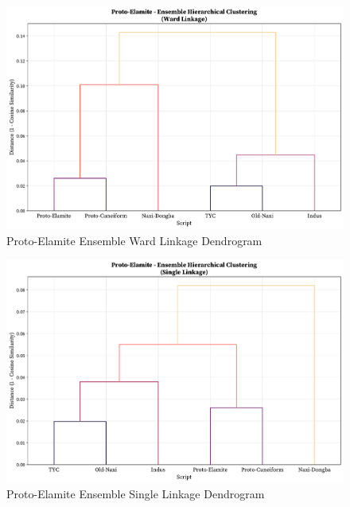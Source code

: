 \documentclass[11pt,a4paper,oneside]{report}
\begin{document}
\begin{figure}[H] 
    \centering
    \includegraphics[width=1\linewidth]{Visualizations/Dendrograms/Proto-Elamite/ensemble_dendrogram_ward.pdf}
     \caption*{Proto-Elamite Ensemble Ward Linkage Dendrogram}
\end{figure}

\begin{figure}[H] 
    \centering
    \includegraphics[width=1\linewidth]{Visualizations/Dendrograms/Proto-Elamite/ensemble_dendrogram_single.pdf}
     \caption*{Proto-Elamite Ensemble Single Linkage Dendrogram}
\end{figure}
\end{document}
